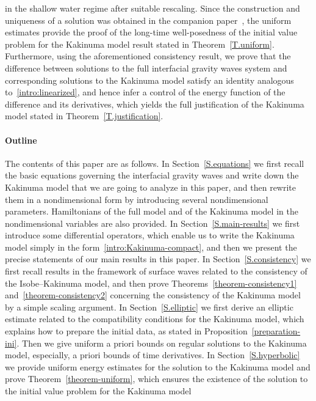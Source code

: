 \documentclass[11pt,leqno]{article}
\numberwithin{equation}{section}
\numberwithin{figure}{section}
\begin{document}
in the shallow water regime after suitable rescaling. 
Since the construction and uniqueness of a solution was obtained in the companion paper~\cite{DucheneIguchi2020},
the uniform estimates provide the proof of the long-time well-posedness of the initial value problem for the Kakinuma model result 
stated in Theorem~\ref{T.uniform}. 
Furthermore, using the aforementioned consistency result, we prove that the difference between solutions to the full interfacial gravity waves system
and corresponding solutions to the Kakinuma model satisfy an identity analogous to~\eqref{intro:linearized}, and hence
infer a control of the energy function of the difference and its derivatives, which yields the full justification of the Kakinuma model stated in Theorem~\ref{T.justification}.

\paragraph{Outline}
The contents of this paper are as follows. 
In Section~\ref{S.equations} we first recall the basic equations governing the interfacial gravity waves 
and write down the Kakinuma model that we are going to analyze in this paper, 
and then rewrite them in a nondimensional form by introducing several nondimensional parameters. 
Hamiltonians of the full model and of the Kakinuma model in the nondimensional variables are also provided. 
In Section~\ref{S.main-results} we first introduce some differential operators, which enable us to write 
the Kakinuma model simply in the form~\eqref{intro:Kakinuma-compact}, and then we present the precise statements of our main results in this paper. 
In Section~\ref{S.consistency} we first recall results in the framework of surface waves related to the consistency 
of the Isobe--Kakinuma model, and then prove Theorems~\ref{theorem-consistency1} and~\ref{theorem-consistency2} 
concerning the consistency of the Kakinuma model by a simple scaling argument. 
In Section~\ref{S.elliptic} we first derive an elliptic estimate related to the compatibility conditions for the Kakinuma model, 
which explains how to prepare the initial data, as stated in Proposition~\ref{preparation-ini}.
Then we give uniform a priori bounds on regular solutions to the Kakinuma model, especially, a priori bounds of time derivatives. 
In Section~\ref{S.hyperbolic} we provide uniform energy estimates for the solution to the Kakinuma model and prove 
Theorem~\ref{theorem-uniform}, which ensures the existence of the solution to the initial value problem for the Kakinuma model 
\end{document}
